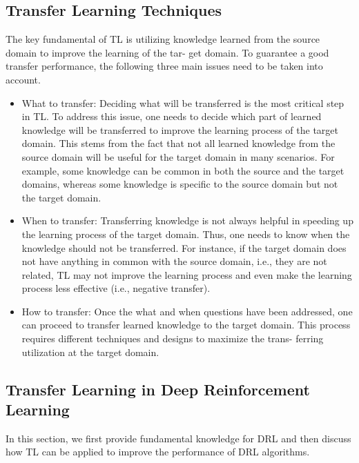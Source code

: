 \documentclass[letterpaper%
, twoside%
, 12pt%
,thesepararticles%
, english%
,creativecommons,hyperref, withAlgo2e%
]{thETS}
\begin{document}
\subsection{Transfer Learning Techniques}

The key fundamental of TL is utilizing knowledge learned from the source domain to improve the learning of the tar- get domain. To guarantee a good transfer performance, the following three main issues need to be taken into account.

\begin{itemize}
	\item What to transfer: Deciding what will be transferred is the most critical step in TL. To address this issue, one needs to decide which part of learned knowledge will be transferred to improve the learning process of the target domain. This stems from the fact that not all learned knowledge from the source domain will be useful for the target domain in many scenarios. For example, some knowledge can be common in both the source and the target domains, whereas some knowledge is specific to the source domain but not the target domain.
	\item When to transfer: Transferring knowledge is not always helpful in speeding up the learning process of the target domain. Thus, one needs to know when the knowledge should not be transferred. For instance, if the target domain does not have anything in common with the source domain, i.e., they are not related, TL may not improve the learning process and even make the learning process less effective (i.e., negative transfer).
	\item How to transfer: Once the what and when questions have been addressed, one can proceed to transfer learned knowledge to the target domain. This process requires different techniques and designs to maximize the trans- ferring utilization at the target domain.
\end{itemize}


\subsection{Transfer Learning in Deep Reinforcement Learning}

In this section, we first provide fundamental knowledge for DRL and then discuss how TL can be applied to improve the performance of DRL algorithms.
\end{document}
